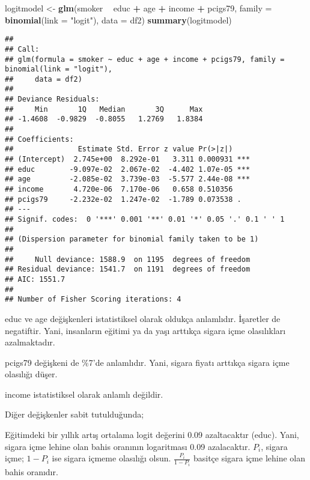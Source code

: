 \documentclass[
]{book}
\newenvironment{Shaded}{\begin{snugshade}}{\end{snugshade}}
\newcommand{\DataTypeTok}[1]{\textcolor[rgb]{0.13,0.29,0.53}{#1}}
\newcommand{\KeywordTok}[1]{\textcolor[rgb]{0.13,0.29,0.53}{\textbf{#1}}}
\newcommand{\NormalTok}[1]{#1}
\newcommand{\OperatorTok}[1]{\textcolor[rgb]{0.81,0.36,0.00}{\textbf{#1}}}
\newcommand{\StringTok}[1]{\textcolor[rgb]{0.31,0.60,0.02}{#1}}
\begin{document}
\begin{Shaded}
\begin{Highlighting}[]
\NormalTok{logitmodel <-}\StringTok{ }\KeywordTok{glm}\NormalTok{(smoker }\OperatorTok{~}\StringTok{ }\NormalTok{educ }\OperatorTok{+}\StringTok{ }\NormalTok{age }\OperatorTok{+}\StringTok{ }\NormalTok{income }\OperatorTok{+}\StringTok{ }\NormalTok{pcigs79, }\DataTypeTok{family =} \KeywordTok{binomial}\NormalTok{(}\DataTypeTok{link =} \StringTok{"logit"}\NormalTok{), }\DataTypeTok{data =}\NormalTok{ df2)}
\KeywordTok{summary}\NormalTok{(logitmodel)}
\end{Highlighting}
\end{Shaded}

\begin{verbatim}
## 
## Call:
## glm(formula = smoker ~ educ + age + income + pcigs79, family = binomial(link = "logit"), 
##     data = df2)
## 
## Deviance Residuals: 
##     Min       1Q   Median       3Q      Max  
## -1.4608  -0.9829  -0.8055   1.2769   1.8384  
## 
## Coefficients:
##               Estimate Std. Error z value Pr(>|z|)    
## (Intercept)  2.745e+00  8.292e-01   3.311 0.000931 ***
## educ        -9.097e-02  2.067e-02  -4.402 1.07e-05 ***
## age         -2.085e-02  3.739e-03  -5.577 2.44e-08 ***
## income       4.720e-06  7.170e-06   0.658 0.510356    
## pcigs79     -2.232e-02  1.247e-02  -1.789 0.073538 .  
## ---
## Signif. codes:  0 '***' 0.001 '**' 0.01 '*' 0.05 '.' 0.1 ' ' 1
## 
## (Dispersion parameter for binomial family taken to be 1)
## 
##     Null deviance: 1588.9  on 1195  degrees of freedom
## Residual deviance: 1541.7  on 1191  degrees of freedom
## AIC: 1551.7
## 
## Number of Fisher Scoring iterations: 4
\end{verbatim}

educ ve age değişkenleri istatistiksel olarak oldukça anlamlıdır. İşaretler de negatiftir. Yani, insanların eğitimi ya da yaşı arttıkça sigara içme olasılıkları azalmaktadır.

pcigs79 değişkeni de \%7'de anlamlıdır. Yani, sigara fiyatı arttıkça sigara içme olasılığı düşer.

income istatistiksel olarak anlamlı değildir.

Diğer değişkenler sabit tutulduğunda;

Eğitimdeki bir yıllık artış ortalama logit değerini 0.09 azaltacaktır (educ). Yani, sigara içme lehine olan bahis oranının logaritması 0.09 azalacaktır. \(P_i\), sigara içme; \(1-P_i\) ise sigara içmeme olasılığı olsun. \(\frac{P_i}{1-P_i}\) basitçe sigara içme lehine olan bahis oranıdır.
\end{document}
